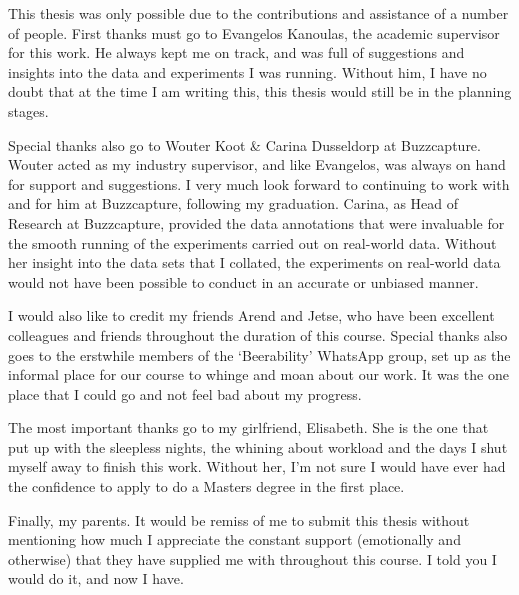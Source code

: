 \documentclass[../main.tex]{subfiles}
\begin{document}
This thesis was only possible due to the contributions and assistance of a number of people. First thanks must go to Evangelos Kanoulas, the academic supervisor for this work. He always kept me on track, and was full of suggestions and insights into the data and experiments I was running. Without him, I have no doubt that at the time I am writing this, this thesis would still be in the planning stages.

Special thanks also go to Wouter Koot \& Carina Dusseldorp at Buzzcapture. Wouter acted as my industry supervisor, and like Evangelos, was always on hand for support and suggestions. I very much look forward to continuing to work with and for him at Buzzcapture, following my graduation. Carina, as Head of Research at Buzzcapture, provided the data annotations that were invaluable for the smooth running of the experiments carried out on real-world data. Without her insight into the data sets that I collated, the experiments on real-world data would not have been possible to conduct in an accurate or unbiased manner.

I would also like to credit my friends Arend and Jetse, who have been excellent colleagues and friends throughout the duration of this course. Special thanks also goes to the erstwhile members of the `Beerability' WhatsApp group, set up as the informal place for our course to whinge and moan about our work. It was the one place that I could go and not feel bad about my progress.

The most important thanks go to my girlfriend, Elisabeth. She is the one that put up with the sleepless nights, the whining about workload and the days I shut myself away to finish this work. Without her, I'm not sure I would have ever had the confidence to apply to do a Masters degree in the first place.

Finally, my parents. It would be remiss of me to submit this thesis without mentioning how much I appreciate the constant support (emotionally and otherwise) that they have supplied me with throughout this course. I told you I would do it, and now I have.
\end{document}
